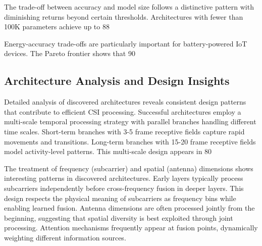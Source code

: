 \documentclass[journal]{IEEEtran}
\begin{document}
The trade-off between accuracy and model size follows a distinctive pattern with diminishing returns beyond certain thresholds. Architectures with fewer than 100K parameters achieve up to 88%

Energy-accuracy trade-offs are particularly important for battery-powered IoT devices. The Pareto frontier shows that 90%

\subsection{Architecture Analysis and Design Insights}

Detailed analysis of discovered architectures reveals consistent design patterns that contribute to efficient CSI processing. Successful architectures employ a multi-scale temporal processing strategy with parallel branches handling different time scales. Short-term branches with 3-5 frame receptive fields capture rapid movements and transitions. Long-term branches with 15-20 frame receptive fields model activity-level patterns. This multi-scale design appears in 80%

The treatment of frequency (subcarrier) and spatial (antenna) dimensions shows interesting patterns in discovered architectures. Early layers typically process subcarriers independently before cross-frequency fusion in deeper layers. This design respects the physical meaning of subcarriers as frequency bins while enabling learned fusion. Antenna dimensions are often processed jointly from the beginning, suggesting that spatial diversity is best exploited through joint processing. Attention mechanisms frequently appear at fusion points, dynamically weighting different information sources.
\end{document}
